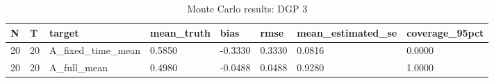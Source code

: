 \begin{table}[!htbp]
\centering
\caption{Monte Carlo results: DGP 3}
\label{tab:mc-dgp3}
\begin{tabular}{llllllll}
\toprule
N & T & target & mean\_truth & bias & rmse & mean\_estimated\_se & coverage\_95pct \\
\midrule
20 & 20 & A\_fixed\_time\_mean & 0.5850 & -0.3330 & 0.3330 & 0.0816 & 0.0000 \\
20 & 20 & A\_full\_mean & 0.4980 & -0.0488 & 0.0488 & 0.9280 & 1.0000 \\
\bottomrule
\end{tabular}
\end{table}
